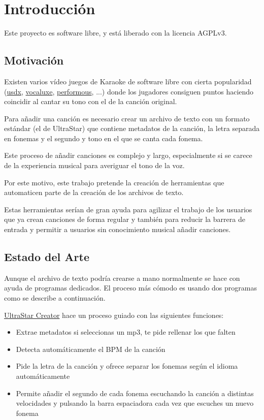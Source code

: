 \chapter{Introducción}

Este proyecto es software libre, y está liberado con la licencia AGPLv3\cite{agpl}.

\section{Motivación}

Existen varios vídeo juegos de Karaoke de software libre con cierta popularidad (\href{https://github.com/UltraStar-Deluxe/USDX}{usdx}, \href{https://github.com/Vocaluxe/Vocaluxe}{vocaluxe}, \href{https://github.com/performous/performous}{performous}, ...) donde los jugadores consiguen puntos haciendo coincidir al cantar su tono con el de la canción original.

Para añadir una canción es necesario crear un archivo de texto con un formato estándar (el de UltraStar) que contiene metadatos de la canción, la letra separada en fonemas y el segundo y tono en el que se canta cada fonema.

Este proceso de añadir canciones es complejo y largo, especialmente si se carece de la experiencia musical para averiguar el tono de la voz.

Por este motivo, este trabajo pretende la creación de herramientas que automaticen parte de la creación de los archivos de texto.

Estas herramientas serían de gran ayuda para agilizar el trabajo de los usuarios que ya crean canciones de forma regular y también para reducir la barrera de entrada y permitir a usuarios sin conocimiento musical añadir canciones.

\section{Estado del Arte}

Aunque el archivo de texto podría crearse a mano normalmente se hace con ayuda de programas dedicados. El proceso más cómodo es usando dos programas como se describe a continuación.

\href{https://github.com/UltraStar-Deluxe/UltraStar-Creator}{UltraStar Creator} hace un proceso guiado con las siguientes funciones:

\begin{itemize}
	\item Extrae metadatos si seleccionas un mp3, te pide rellenar los que falten
	\item Detecta automáticamente el BPM de la canción
	\item Pide la letra de la canción y ofrece separar los fonemas según el idioma automáticamente
	\item Permite añadir el segundo de cada fonema escuchando la canción a distintas velocidades y pulsando la barra espaciadora cada vez que escuches un nuevo fonema
\end{itemize}

